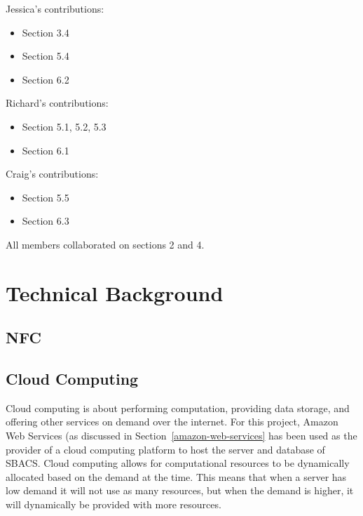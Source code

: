 \documentclass[12pt]{report}
\let\Oldsection\section
\renewcommand{\section}{\FloatBarrier\Oldsection}
\begin{document}
Jessica's contributions:
\begin{itemize}
\item Section 3.4
\item Section 5.4
\item Section 6.2
\end{itemize}

Richard's contributions:
\begin{itemize}
\item Section 5.1, 5.2, 5.3
\item Section 6.1
\end{itemize}

Craig's contributions:
\begin{itemize}
\item Section 5.5
\item Section 6.3
\end{itemize}

All members collaborated on sections 2 and 4.


\chapter{Technical Background} \label{technical-background}


\section{NFC} \label{nfc}


\section{Cloud Computing} \label{cloud-computing}


Cloud computing is about performing computation, providing data storage, and offering other services
on demand over the internet. For this project, Amazon Web Services (as discussed in Section~\ref{amazon-web-services}
has been used as the provider of a cloud computing platform to host the server and database of SBACS.
Cloud computing allows for computational resources to be dynamically allocated based on the demand
at the time. This means that when a server has low demand it will not use as many resources, but when
the demand is higher, it will dynamically be provided with more resources.
\end{document}

